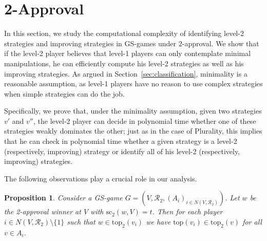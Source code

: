 \documentclass[11pt]{article}
\newtheorem{proposition}{Proposition}
\newcommand{\calR}{\mathcal{R}}
\newcommand{\tp}{\mathrm{top}}
\newcommand{\scr}{\mathrm{sc}}
\begin{document}
\section{2-Approval}\label{sec:2app}
In this section, we study the computational complexity of identifying level-2 strategies 
and improving strategies in GS-games under $2$-approval. We show that if the level-2 player believes
that level-1 players can only contemplate minimal manipulations, 
he can efficiently compute his level-2 strategies as well as his improving strategies. 
As argued in Section~\ref{sec:classification}, 
minimality is a reasonable assumption, as level-1 players have no reason to use complex
strategies when simple strategies can do the job.

Specifically, we prove that,  
under the minimality assumption, given two strategies $v'$ and $v''$, 
the level-2 player can decide in polynomial time whether one of these strategies weakly dominates the other;
just as in the case of Plurality, this implies that he 
can check in polynomial time whether
a given strategy is a level-2 (respectively, improving) strategy or identify all of his level-2 
(respectively, improving) strategies.

The following observations play a crucial role in our analysis.

\begin{proposition}\label{prop:2app-demote}
Consider a GS-game $G=(V, \calR_2, (A_i)_{i\in N(V, \calR_2)})$.
Let $w$ be the 2-approval winner at $V$ with $\scr_2(w, V)=t$.
Then for each player $i\in N(V, \calR_2)\setminus\{1\}$
such that $w\in\tp_2(v_i)$ we have $\tp(v_i)\in \tp_2(v)$ for all $v\in A_i$.
\end{proposition}
\end{document}
